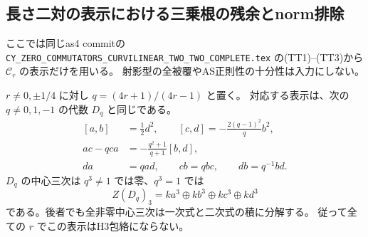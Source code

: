\subsection{長さ二対の表示における三乗根の残余とnorm排除}
\label{subsec:as4-tt22-exclusions}
ここでは同じas4 commit\cite{AS4lowpinned}の
{\small\texttt{CY\_ZERO\_COMMUTATORS\_CURVILINEAR\_TWO\_TWO\_COMPLETE.tex}}
の(TT1)--(TT3)から $\mathcal C_r$ の表示だけを用いる。
射影型の全被覆やAS正則性の十分性は入力にしない。

\begin{theorem}
\label{thm:tt22-C-all-excluded}
$r\ne0,\pm1/4$ に対し $q=(4r+1)/(4r-1)$ と置く。
対応する表示は、次の $q\ne0,1,-1$ の代数 $D_q$ と同じである。
\[
\begin{split}
 [a,b]&=\tfrac12d^2,\qquad
 [c,d]=-\frac{2(q-1)^2}{q}b^2,\\
 ac-qca&=-\frac{q^2+1}{q+1}[b,d],\\
 da&=qad,\qquad cb=qbc,\qquad db=q^{-1}bd.
\end{split}
\]
$D_q$ の中心三次は $q^3\ne1$ では零、$q^3=1$ では
\[
 Z(D_q)_3=ka^3\oplus kb^3\oplus kc^3\oplus kd^3
\]
である。後者でも全非零中心三次は一次式と二次式の積に分解する。
従って全ての $r$ でこの表示はH3包絡にならない。
\end{theorem}
